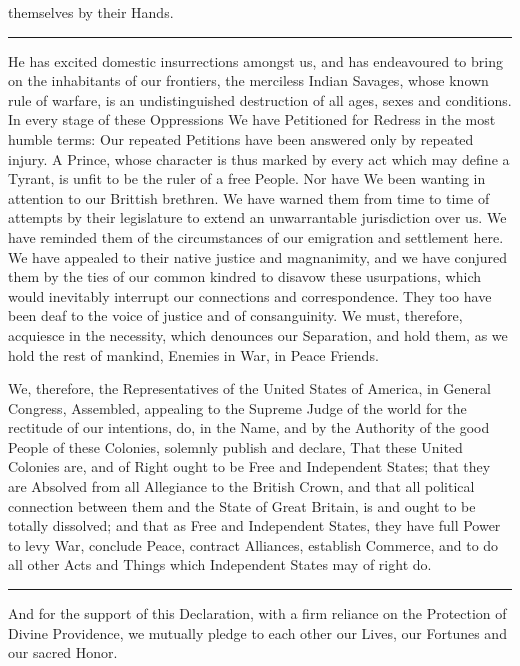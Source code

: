 \documentclass{article}
\begin{document}
themselves by their Hands.\rule[.5ex]{2em}{.2pt}He has excited domestic insurrections amongst us, and has endeavoured to bring on the inhabitants of our frontiers, the merciless Indian Savages, whose known rule of warfare, is an undistinguished destruction of all ages, sexes and conditions.
In every stage of these Oppressions We have Petitioned for Redress in the most humble terms: Our repeated Petitions have been answered only by repeated injury. A Prince, whose character is thus marked by every act which may define a Tyrant, is unfit to be the ruler of a free People. Nor have We been wanting in attention to our Brittish brethren. We have warned them from time to time of attempts by their legislature to extend an unwarrantable jurisdiction over us. We have reminded them of the circumstances of our emigration and settlement here. We have appealed to their native justice and magnanimity, and we have conjured them by the ties of our common kindred to disavow these usurpations, which would inevitably interrupt our connections and correspondence. They too have been deaf to the voice of justice and of consanguinity. We must, therefore, acquiesce in the necessity, which denounces our Separation, and hold them, as we hold the rest of mankind, Enemies in War, in Peace Friends.

We, therefore, \rmfamily the Representatives of the  United States of America, \rmfamily in General Congress, Assembled, appealing to the Supreme Judge of the world for the rectitude of our intentions, do, in the Name, and by the Authority of the good People of these Colonies, solemnly publish and declare, That these United Colonies are, and of Right ought to be  Free and Independent States; \rmfamily that they are Absolved from all Allegiance to the British Crown, and that all political connection between them and the State of Great Britain, is and ought to be totally dissolved; and that as Free and Independent States, they have full Power to levy War, conclude Peace, contract Alliances, establish Commerce, and to do all other Acts and Things which Independent States may of right do.\rule[.5ex]{2em}{.2pt}And for the support of this Declaration, with a firm reliance on the Protection of Divine Providence, we mutually pledge to each other our Lives, our Fortunes and our sacred Honor.
\end{document}
